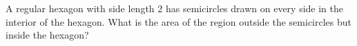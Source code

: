 A regular hexagon with side length $2$ has semicircles drawn on every side in the interior of the hexagon. What is the area of the region outside the semicircles but inside the hexagon?